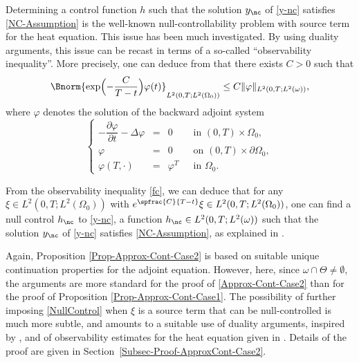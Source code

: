 \begin{remark}
Determining a control function $h$ such that the solution $y_{\nc}$ of \eqref{y-nc} satisfies \eqref{NC-Assumption} is the well-known null-controllability problem with source term for the heat equation. This issue has been much investigated. By using duality arguments, this issue can be recast in terms of a so-called ``observability inequality''. More precisely, one can deduce from \cite[Lem.\,2.1]{FursikovImanuvilov} that there exists $C>0$ such that
\begin{equation}\label{fc}
\Bnorm{\exp\Bigl(- \frac{C}{T-t}\Bigr)\varphi(t)}_ {L^2(0,T; L^2(\Omega_0))} \leq C \| \varphi \|_{L^2(0,T; L^2(\omega))},
\end{equation}
where $\varphi$ denotes the solution of the backward adjoint system
\begin{equation*}
\left\{
\begin{array}{rcll}
-\dfrac{\partial \varphi}{\partial t}-\Delta \varphi &=&0 \quad&\text{ in }(0,T) \times \Omega_0,
\\
\varphi &=& 0 &\text{ on }(0,T) \times \partial \Omega_0,
\\
\varphi\left(T,\cdot\right) &=& \varphi^T &\text{ in }\Omega_0.
\end{array}
\right.
\end{equation*}

From the observability inequality \eqref{fc}, we can deduce that for any $\xi\in L^2(0,T; L^2(\Omega_0))$ with $e^{\spfrac{C}{T-t}}\xi \in L^2(0,T; L^2(\Omega_0))$, one can find a null control $h_{\nc}$ to \eqref{y-nc}, \ie a function $h_{\nc} \in L^2(0,T; L^2(\omega))$ such that the solution $y_{\nc}$ of \eqref{y-nc} satisfies \eqref{NC-Assumption}, as explained in \cite[Proof of Th.\,2.1]{FursikovImanuvilov}.
\end{remark}

Again, Proposition \ref{Prop-Approx-Cont-Case2} is based on suitable unique continuation properties for the adjoint equation. However, here, since $\omega \cap \Theta \neq\emptyset$, the arguments are more standard for the proof of \eqref{Approx-Cont-Case2} {than for the proof of Proposition \ref{Prop-Approx-Cont-Case1}}. The possibility of further imposing \eqref{NullControl} when $\xi$ is a source term that can be null-controlled is much more subtle, and amounts to a suitable use of duality arguments, inspired by \cite{Lions-1992}, and of observability estimates for the heat equation given in \cite{FursikovImanuvilov}. Details of the proof are given in Section~\ref{Subsec-Proof-ApproxCont-Case2}.

